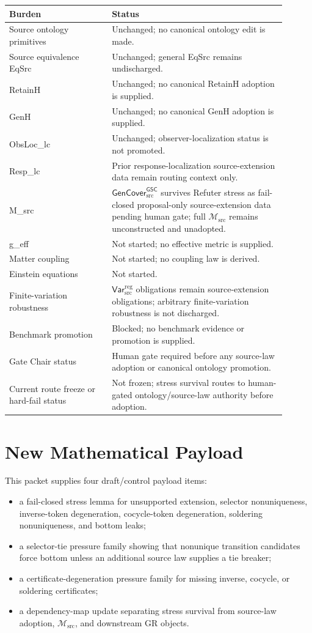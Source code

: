 \documentclass[11pt]{article}
\newcommand{\Msrc}{\mathcal{M}_{\mathrm{src}}}
\newcommand{\GenCover}{\mathsf{GenCover}_{\mathrm{src}}^{\mathsf{GSC}}}
\newcommand{\VarRegSrc}{\mathsf{Var}^{\mathrm{reg}}_{\mathrm{src}}}
\begin{document}
\begin{center}
\begin{tabular}{p{0.33\linewidth}p{0.57\linewidth}}
\hline
Burden & Status \\
\hline
Source ontology primitives & Unchanged; no canonical ontology edit is made. \\
Source equivalence EqSrc & Unchanged; general EqSrc remains undischarged. \\
RetainH & Unchanged; no canonical RetainH adoption is supplied. \\
GenH & Unchanged; no canonical GenH adoption is supplied. \\
ObsLoc\_lc & Unchanged; observer-localization status is not promoted. \\
Resp\_lc & Prior response-localization source-extension data remain routing context only. \\
M\_src & \(\GenCover\) survives Refuter stress as fail-closed proposal-only source-extension data pending human gate; full \(\Msrc\) remains unconstructed and unadopted. \\
g\_eff & Not started; no effective metric is supplied. \\
Matter coupling & Not started; no coupling law is derived. \\
Einstein equations & Not started. \\
Finite-variation robustness & \(\VarRegSrc\) obligations remain source-extension obligations; arbitrary finite-variation robustness is not discharged. \\
Benchmark promotion & Blocked; no benchmark evidence or promotion is supplied. \\
Gate Chair status & Human gate required before any source-law adoption or canonical ontology promotion. \\
Current route freeze or hard-fail status & Not frozen; stress survival routes to human-gated ontology/source-law authority before adoption. \\
\hline
\end{tabular}
\end{center}

\section{New Mathematical Payload}

This packet supplies four draft/control payload items:
\begin{itemize}
  \item a fail-closed stress lemma for unsupported extension, selector
  nonuniqueness, inverse-token degeneration, cocycle-token degeneration,
  soldering nonuniqueness, and bottom leaks;
  \item a selector-tie pressure family showing that nonunique transition
  candidates force bottom unless an additional source law supplies a tie
  breaker;
  \item a certificate-degeneration pressure family for missing inverse,
  cocycle, or soldering certificates;
  \item a dependency-map update separating stress survival from source-law
  adoption, \(\Msrc\), and downstream GR objects.
\end{itemize}
\end{document}
